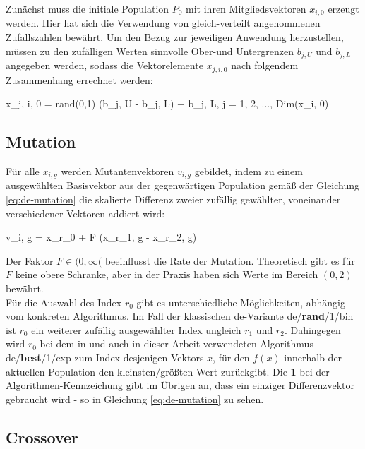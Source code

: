 			Zunächst muss die initiale Population $P_{0}$ mit ihren Mitgliedsvektoren $x_{i, 0}$ erzeugt werden. Hier hat sich die Verwendung von gleich-verteilt angenommenen Zufallszahlen bewährt. Um den Bezug zur jeweiligen Anwendung herzustellen, müssen zu den zufälligen Werten sinnvolle Ober-und Untergrenzen $b_{j, U}$ und $b_{j, L}$ angegeben werden, sodass die Vektorelemente $x_{j, i, 0}$ nach folgendem Zusammenhang errechnet werden:
			\begin{flalign}
				x_{j, i, 0} = rand(0,1) \cdot (b_{j, U} - b_{j, L}) + b_{j, L}, \quad j = 1, 2, ..., Dim(x_{i, 0}) \label{eq:de-init}
			\end{flalign}  
			
		\subsection{Mutation}
		\label{sub:de-mutation}
		
			Für alle $x_{i, g}$ werden Mutantenvektoren $v_{i, g}$ gebildet, indem zu einem ausgewählten Basisvektor aus der gegenwärtigen Population gemäß der Gleichung \ref{eq:de-mutation} die skalierte Differenz zweier zufällig gewählter, voneinander verschiedener Vektoren addiert wird: 
			\begin{flalign}
				v_{i, g} = x_{r_{0}} + F \cdot (x_{r_{1}, g} - x_{r_{2}, g}) \label{eq:de-mutation}
			\end{flalign}
			Der Faktor $F \in (0,\infty($ beeinflusst die Rate der Mutation. Theoretisch gibt es für $F$ keine obere Schranke, aber in der Praxis haben sich Werte im Bereich $(0,2)$ bewährt.\\
			Für die Auswahl des Index $r_{0}$ gibt es unterschiedliche Möglichkeiten, abhängig vom konkreten Algorithmus. Im Fall der klassischen \gls{de}-Variante \gls{de}/\textbf{rand}/1/bin
			ist $r_{0}$ ein weiterer zufällig ausgewählter Index ungleich $r_{1}$ und $r_{2}$. Dahingegen wird $r_{0}$ bei dem in \cite{cuevas-meth1} und auch in dieser Arbeit verwendeten Algorithmus \gls{de}/\textbf{best}/1/exp zum Index desjenigen Vektors $x$, für den $f(x)$ innerhalb der aktuellen Population den kleinsten/größten Wert zurückgibt. Die \textbf{1} bei der Algorithmen-Kennzeichung gibt im Übrigen an, dass ein einziger Differenzvektor gebraucht wird - so in Gleichung \ref{eq:de-mutation} zu sehen.
		\subsection{Crossover}
		\label{sub:de-crossover}
		
